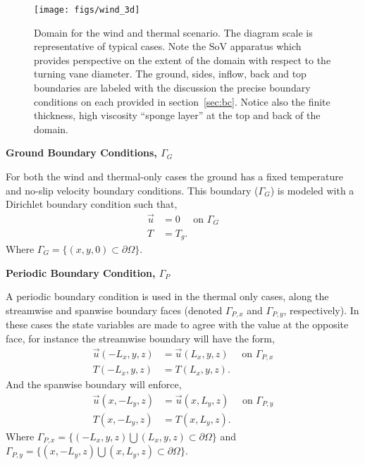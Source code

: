 \begin{figure}[!htb]
  \begin{center}
   \texttt{[image: figs/wind\_3d]}
    \caption{Domain for the wind and thermal scenario. The diagram scale
   is representative of typical cases. Note the SoV apparatus which
   provides perspective on the extent of the domain with respect to the
   turning vane diameter. The ground, sides, inflow, back and top
   boundaries are labeled with the discussion the precise boundary
   conditions on each provided in section~\ref{sec:bc}. Notice also the
   finite thickness, high viscosity ``sponge layer'' at the top and back
   of the domain.}   
    \label{fig:wind3d}
  \end{center}
\end{figure}

\textbf{Ground Boundary Conditions, $\Gamma_G$} 

For both the wind and thermal-only cases the ground has a fixed
temperature and no-slip velocity boundary conditions. This boundary 
($\Gamma_G$) is modeled with a Dirichlet boundary condition such that, 
\begin{align}
 \overrightarrow{u} &= 0 \quad \text{ on } \Gamma_G \\
 T &= T_g.
\end{align}
Where $\Gamma_G = \{(x,y,0) \subset \partial \Omega \} $. 

%
%
%
\textbf{Periodic Boundary Condition, $\Gamma_P$} 

A periodic boundary condition is used in the thermal only cases, 
along the streamwise and spanwise boundary faces 
(denoted $\Gamma_{P,x}$ and $\Gamma_{P,y}$, respectively). In these
cases the state variables  
are made to agree with the value at the opposite face, for instance the 
streamwise boundary will have the form, 
\begin{align}
 \overrightarrow{u}(-L_x,y,z) &= \overrightarrow{u}(L_x,y,z) \quad \text{ on } \Gamma_{P,x} \\
 T(-L_x,y,z) &= T(L_x,y,z). 
\end{align}
And the spanwise boundary will enforce, 
\begin{align}
 \overrightarrow{u}(x,-L_y,z) &= \overrightarrow{u}(x,L_y,z) \quad \text{ on } \Gamma_{P,y} \\
 T(x,-L_y,z) &= T(x,L_y,z). 
\end{align}
Where $\Gamma_{P,x} = \{(-L_x,y,z) \bigcup (L_x,y,z) \subset \partial
\Omega \}$  
and $\Gamma_{P,y} = \{(x,-L_y,z) \bigcup (x,L_y,z) \subset \partial
\Omega \}$. 

